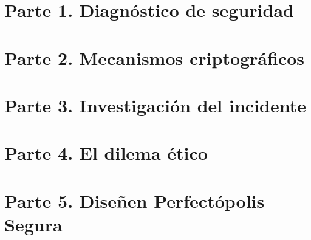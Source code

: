 \documentclass[12pt]{article} %
\begin{document}
\hypersetup{pageanchor=false}

\hypersetup{pageanchor=true}

\section*{Parte 1. Diagnóstico de seguridad}


\section*{Parte 2. Mecanismos criptográficos}


\section*{Parte 3. Investigación del incidente}


\section*{Parte 4. El dilema ético}


\section*{Parte 5. Diseñen Perfectópolis Segura}

\end{document}
